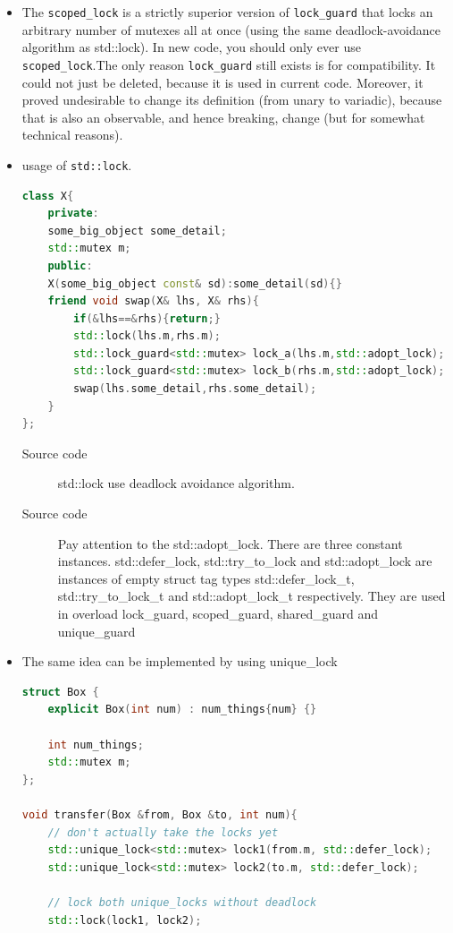 \documentclass[a4paper,11pt,twoside]{book}
\begin{document}
\begin{itemize}
\item The \texttt{scoped\_lock} is a strictly superior version of \texttt{lock\_guard} that locks an arbitrary number of mutexes all at once (using the same deadlock-avoidance algorithm as std::lock). In new code, you should only ever use \texttt{scoped\_lock}.The only reason \texttt{lock\_guard} still exists is for compatibility. It could not just be deleted, because it is used in current code. Moreover, it proved undesirable to change its definition (from unary to variadic), because that is also an observable, and hence breaking, change (but for somewhat technical reasons).

	\item usage of \texttt{std::lock}. 
\begin{lstlisting}[frame=single, language=c++]	
class X{
	private:
	some_big_object some_detail;
	std::mutex m;
	public:
	X(some_big_object const& sd):some_detail(sd){}
	friend void swap(X& lhs, X& rhs){
		if(&lhs==&rhs){return;}
		std::lock(lhs.m,rhs.m);
		std::lock_guard<std::mutex> lock_a(lhs.m,std::adopt_lock);
		std::lock_guard<std::mutex> lock_b(rhs.m,std::adopt_lock);
		swap(lhs.some_detail,rhs.some_detail);
	}
};
\end{lstlisting}
\begin{description}
	\item[Source code] std::lock use deadlock avoidance algorithm. 
	\item[Source code] Pay attention to the std::adopt\_lock. There are three constant instances. std::defer\_lock, std::try\_to\_lock and std::adopt\_lock are instances of empty struct tag types std::defer\_lock\_t, std::try\_to\_lock\_t and std::adopt\_lock\_t respectively. They are used in overload lock\_guard, scoped\_guard, shared\_guard and unique\_guard
\end{description}

	\item The same idea can be implemented by using unique\_lock
\begin{lstlisting}[frame=single, language=c++]	
struct Box {
	explicit Box(int num) : num_things{num} {}
	
	int num_things;
	std::mutex m;
};

void transfer(Box &from, Box &to, int num){
	// don't actually take the locks yet
	std::unique_lock<std::mutex> lock1(from.m, std::defer_lock);
	std::unique_lock<std::mutex> lock2(to.m, std::defer_lock);
	
	// lock both unique_locks without deadlock
	std::lock(lock1, lock2);
	

\end{lstlisting}
\end{itemize}
\end{document}
